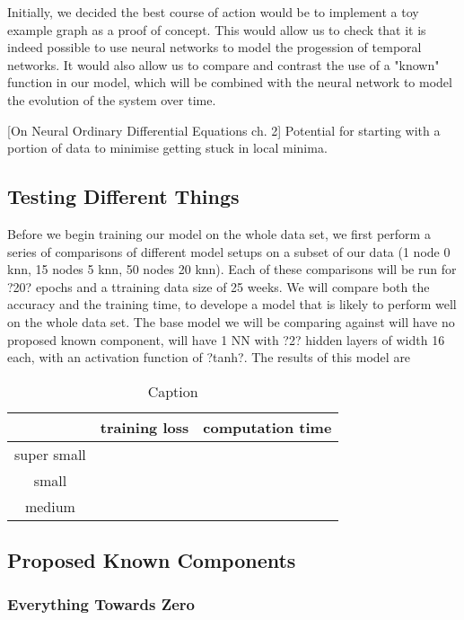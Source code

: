 \documentclass[12pt]{article}
\begin{document}
    
    
    Initially, we decided the best course of action would be to implement a toy example graph as a proof of concept.
    This would allow us to check that it is indeed possible to use neural networks to model the progession of temporal networks.
    It would also allow us to compare and contrast the use of a "known" function in our model, which will be combined with the 
    neural network to model the evolution of the system over time.
    
    [On Neural Ordinary Differential Equations ch. 2] Potential for starting with a portion of data to minimise getting stuck in 
    local minima.
    \subsection{Testing Different Things}
        Before we begin training our model on the whole data set, we first perform a series of comparisons of different model setups on a subset of our data (1 node 0 knn, 15 nodes 5 knn, 50 nodes 20 knn). Each of these comparisons will be run for ?20? epochs and a ttraining data size of 25 weeks. We will compare both the accuracy and the training time, to develope a model that is likely to perform well on the whole data set. The base model we will be comparing against will have no proposed known component, will have 1 NN with ?2? hidden layers of width 16 each, with an activation function of ?tanh?. The results of this model are
        \begin{table}[]
            \centering
            \begin{tabular}{c|c|c}
                 & training loss & computation time \\
                 \hline
                 super small &  \\
                 small & \\
                 medium &
            \end{tabular}
            \caption{Caption}
            \label{tab:my_label}
        \end{table}
        
    \subsection{Proposed Known Components}
        \subsubsection{Everything Towards Zero} 
\end{document}

